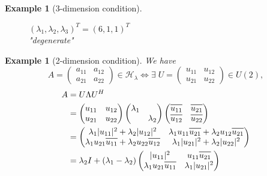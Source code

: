 \documentclass[11pt]{amsart}
\numberwithin{equation}{section}
\theoremstyle{plain}
\newtheorem{eg}[theorem]{Example}
\theoremstyle{plain}
\numberwithin{equation}{section}
\theoremstyle{remark}
\newcommand*\widebar[1]{%
	\hbox{%
		\vbox{%
			\hrule height 0.5pt %
			\kern0.6ex%
			\hbox{%
				\kern 0em%
				\ensuremath{#1}%
				\kern 0em%
			}%
		}%
	}%
}
\begin{document}
\begin{eg}[3-dimension condition]
\begin{figure}[H]
\begin{minipage}[t]{.49\textwidth}
	 		$(\lambda_1,\lambda_2,\lambda_3)^T=(6,1,1)^T$\\"degenerate"
	 	\end{minipage}
	 \end{figure}	
\end{eg}
\begin{eg}[2-dimension condition]
	We have
	$$A= \begin{pmatrix}
	a_{11} & a_{12} \\
	a_{21} & a_{22}
	\end{pmatrix}
	 \in \mathcal{H}_\lambda \Leftrightarrow \exists \;
	 U=\begin{pmatrix}
	 u_{11} & u_{12} \\
	 u_{21} & u_{22}
	 \end{pmatrix}
	 \in U(2),$$
\begin{equation*}
 	\begin{aligned}
 	A&= U\Lambda U^H \\ 	
 	&=\begin{pmatrix}
 	u_{11} & u_{12} \\
 	u_{21} & u_{22}
 	\end{pmatrix}
 	\begin{pmatrix}
 	\lambda_1 &  \\
 	& \lambda_2
 	\end{pmatrix}
 	\begin{pmatrix}
 	\widebar{u_{11}} & \widebar{u_{21}} \\
 	\widebar{u_{12}} & \widebar{u_{22}}
 	\end{pmatrix} \\
 	&=\begin{pmatrix}
 	\lambda_1|u_{11}|^2+\lambda_2 |u_{12}|^2 & \lambda_1  u_{11} \widebar{u_{21}}+\lambda_2 u_{12} \widebar{u_{21}} \\
 	\lambda_1 u_{21} \widebar{u_{11}}+\lambda_2 u_{22} \widebar{u_{12}} & \lambda_1|u_{21}|^2+\lambda_2 |u_{22}|^2
 	\end{pmatrix} \\
 	&=\lambda_2 I + (\lambda_1 - \lambda_2)
 	\begin{pmatrix}
 	|u_{11}|^2 & u_{11} \widebar{u_{21}} \\
 	\lambda_1 u_{21} \widebar{u_{11}} & \lambda_1|u_{21}|^2
 	\end{pmatrix}
 	\end{aligned}
\end{equation*}
	  	\begin{figure}[th]
	\begin{minipage}[t]{.49\textwidth}

\end{minipage}
\end{figure}
\end{eg}
\end{document}
